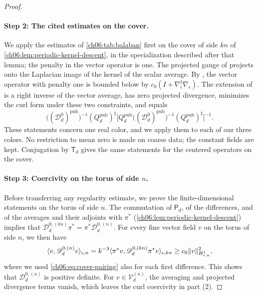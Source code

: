 \begin{proof}
\paragraph{Step 2: The cited estimates on the cover.}
We apply the estimates of \cref{ch06:tab:balaban} first on the cover of side $kn$ of \cref{ch06:lem:periodic-kernel-descent}, in the specialization described after that lemma; the penalty in the vector operator is one. The projected gauge of \cite[(1.39)--(1.44), pp.~24--25]{Balaban1984I} projects onto the Laplacian image of the kernel of the scalar average. By \cite[Proposition~1.1, (1.89)--(1.90), p.~33]{Balaban1984I}, the vector operator with penalty one is bounded below by $c_0(I+\nabla_\epsilon^\sharp\nabla_\epsilon)$. The extension of \cite[(1.60)--(1.64), pp.~28--29; (1.103), p.~34]{Balaban1984I} is a right inverse of the vector average, has zero projected divergence, minimizes the curl form under these two constraints, and equals
\[
 \bigl((\mathscr D_d^0)^{\mathrm{pub}}\bigr)^{-1}(Q_d^{\mathrm{pub}})^\sharp\bigl[Q_d^{\mathrm{pub}}\bigl((\mathscr D_d^0)^{\mathrm{pub}}\bigr)^{-1}(Q_d^{\mathrm{pub}})^\sharp\bigr]^{-1}.
\]
These statements concern one real color, and we apply them to each of our three colors. No restriction to mean zero is made on coarse data; the constant fields are kept. Conjugation by $\mathsf T_d$ gives the same statements for the centered operators on the cover.

\paragraph{Step 3: Coercivity on the torus of side $n$.}
Before transferring any regularity estimate, we prove the finite-dimensional statements on the torus of side $n$. The commutation of $\mathsf P_d$, of the differences, and of the averages and their adjoints with $\pi^*$ (\cref{ch06:lem:periodic-kernel-descent}) implies that $\mathscr D_d^{0,(kn)}\pi^*=\pi^*\mathscr D_d^{0,(n)}$. For every fine vector field $v$ on the torus of side $n$, we then have
\begin{equation}\label{ch06:eq:precision-descent}
 \langle v,\mathscr D_d^{0,(n)}v\rangle_{\epsilon,n}=k^{-3}\langle\pi^*v,\mathscr D_d^{0,(kn)}\pi^*v\rangle_{\epsilon,kn}\ge c_0\lVert v\rVert_{H^1_{\epsilon,n}}^2,
\end{equation}
where we used \eqref{ch06:eq:cover-pairing} also for each first difference. This shows that $\mathscr D_d^{0,(n)}$ is positive definite. For $v\in\mathcal V_d^{(n)}$, the averaging and projected divergence terms vanish, which leaves the curl coercivity in part (2).


\end{proof}
